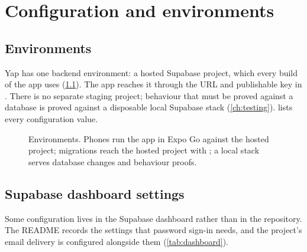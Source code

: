 \chapter{Configuration and environments}
\label{ch:configuration}

\section{Environments}

Yap has one backend environment: a hosted Supabase project, which every build of the app uses
(\cref{fig:deployment}). The app reaches it through the URL and publishable key in
. There is no separate staging project; behaviour that must be proved
against a database is proved against a disposable local Supabase stack (\cref{ch:testing}).
 lists every configuration value.

\begin{figure}[ht]
  \centering
  
  \caption{Environments. Phones run the app in Expo Go against the hosted project; migrations reach the
    hosted project with ; a local stack serves database changes and behaviour proofs.}
  \label{fig:deployment}
\end{figure}

\section{Supabase dashboard settings}
\label{sec:dashboard}

Some configuration lives in the Supabase dashboard rather than in the repository. The README records the
settings that password sign-in needs, and the project's email delivery is configured alongside them
(\cref{tab:dashboard}).

